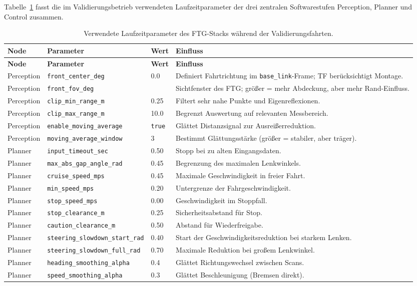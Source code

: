 Tabelle~\ref{tab:ftg_runtime_parameter} fasst die im Validierungsbetrieb verwendeten Laufzeitparameter der drei zentralen Softwarestufen Perception, Planner und Control zusammen.
\renewcommand{\arraystretch}{1.2}
\begin{longtable}{p{2.6cm} p{3.0cm} p{1.8cm} p{6.2cm}}
\caption{Verwendete Laufzeitparameter des FTG-Stacks während der Validierungsfahrten.}
\label{tab:ftg_runtime_parameter}\\
\toprule
\textbf{Node} & \textbf{Parameter} & \textbf{Wert} & \textbf{Einfluss} \\
\midrule
\endfirsthead

\toprule
\textbf{Node} & \textbf{Parameter} & \textbf{Wert} & \textbf{Einfluss} \\
\midrule
\endhead

Perception & \texttt{front\_center\_deg} & 0.0 & Definiert Fahrtrichtung im \texttt{base\_link}-Frame; TF berücksichtigt Montage. \\
Perception & \texttt{front\_fov\_deg} & \textit{} & Sichtfenster des FTG; größer = mehr Abdeckung, aber mehr Rand-Einfluss. \\
Perception & \texttt{clip\_min\_range\_m} & 0.25 & Filtert sehr nahe Punkte und Eigenreflexionen. \\
Perception & \texttt{clip\_max\_range\_m} & 10.0 & Begrenzt Auswertung auf relevanten Messbereich. \\
Perception & \texttt{enable\_moving\_average} & \texttt{true} & Glättet Distanzsignal zur Ausreißerreduktion. \\
Perception & \texttt{moving\_average\_window} & 3 & Bestimmt Glättungsstärke (größer = stabiler, aber träger). \\

Planner & \texttt{input\_timeout\_sec} & 0.50 & Stopp bei zu alten Eingangsdaten. \\
Planner & \texttt{max\_abs\_gap\_angle\_rad} & 0.45 & Begrenzung des maximalen Lenkwinkels. \\
Planner & \texttt{cruise\_speed\_mps} & 0.45 & Maximale Geschwindigkeit in freier Fahrt. \\
Planner & \texttt{min\_speed\_mps} & 0.20 & Untergrenze der Fahrgeschwindigkeit. \\
Planner & \texttt{stop\_speed\_mps} & 0.00 & Geschwindigkeit im Stoppfall. \\
Planner & \texttt{stop\_clearance\_m} & 0.25 & Sicherheitsabstand für Stop. \\
Planner & \texttt{caution\_clearance\_m} & 0.50 & Abstand für Wiederfreigabe. \\
Planner & \texttt{steering\_slowdown\_start\_rad} & 0.40 & Start der Geschwindigkeitsreduktion bei starkem Lenken. \\
Planner & \texttt{steering\_slowdown\_full\_rad} & 0.70 & Maximale Reduktion bei großem Lenkwinkel. \\
Planner & \texttt{heading\_smoothing\_alpha} & 0.4 & Glättet Richtungswechsel zwischen Scans. \\
Planner & \texttt{speed\_smoothing\_alpha} & 0.3 & Glättet Beschleunigung (Bremsen direkt). \\


\end{longtable}
